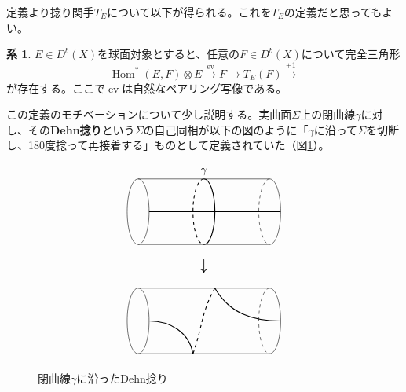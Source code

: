 \documentclass[a4j,uplatex,dvipdfmx]{jsarticle}
\numberwithin{equation}{section}
\numberwithin{figure}{section}
\theoremstyle{definition}
\newtheorem{corollary}[theorem]{系}
\DeclareMathOperator{\Hom}{\mathrm{Hom}}
\DeclareMathOperator{\ev}{\mathrm{ev}}
\begin{document}
定義より捻り関手$T_E$について以下が得られる。これを$T_E$の定義だと思ってもよい。
\begin{corollary}
    $E \in D^b(X)$を球面対象とすると、任意の$F \in D^b(X)$について完全三角形
    \begin{equation}\label{eq:twist}
        \Hom^*(E, F) \otimes E \xrightarrow{\ev} F \to T_E (F) \xrightarrow{+1}
    \end{equation}
    が存在する。ここで$\ev$は自然なペアリング写像である。
\end{corollary}
この定義のモチベーションについて少し説明する。実曲面$\Sigma$上の閉曲線$\gamma$に対し、その\textbf{Dehn捻り}という$\Sigma$の自己同相が以下の図のように「$\gamma$に沿って$\Sigma$を切断し、180度捻って再接着する」ものとして定義されていた（図\ref{fig:dehn-twist}）。


\begin{figure}[h]
    \centering
    \begin{displaymath}
        \begin{tikzpicture}[scale=0.7]
            \draw (0,0+5)--(6,0+5);
            \draw (0,3+5)--(6,3+5);

            \draw[thick] (0.5, 1.5+5)--(6.5, 1.5+5);

            \draw (0, 1.5+5) circle[x radius=0.5, y radius=1.5];

            \draw(6, 0+5)arc(-90:90:0.5 and 1.5);
            \draw[dashed](6, 3+5)arc(90:270:0.5 and 1.5);

            \draw[thick](3, 0+5)arc(-90:90:0.5 and 1.5);
            \draw[thick, dashed](3, 3+5)arc(90:270:0.5 and 1.5);


            \draw(3, 3+5) node[above]{$\gamma$};

            \draw(3, -0.5+5) node[below]{\Large$\downarrow$};


            \draw (0,0)--(6,0);
            \draw (0,3)--(6,3);

            \draw (0, 1.5) circle[x radius=0.5, y radius=1.5];

            \draw(6, 0)arc(-90:90:0.5 and 1.5);
            \draw[dashed](6, 3)arc(90:270:0.5 and 1.5);

            \draw[thick](0.5, 1.5) to[out=0,in=100](2.5, 0);
            \draw[thick, dashed](2.5, 0) to[out=70,in=-120](3.5, 3);
            \draw[thick](3.5, 3) to[out=-60,in=180](6.5, 1.5);
        \end{tikzpicture}
    \end{displaymath}
    \caption{閉曲線$\gamma$に沿ったDehn捻り}
    \label{fig:dehn-twist}
\end{figure}
\end{document}
